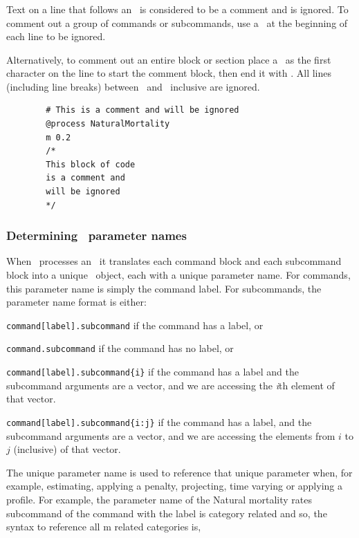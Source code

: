 \subsubsection{}
Text on a line that follows an \commentline\ is considered to be a comment and is ignored. To comment out a group of commands or subcommands, use a \commentline\ at the beginning of each line to be ignored.

Alternatively, to comment out an entire block or section place a \commentstart\ as the first character on the line to start the comment block, then end it with \commentend. All lines (including line breaks) between \commentstart\ and \commentend\ inclusive are ignored. 
{\small{\begin{verbatim}
		# This is a comment and will be ignored
		@process NaturalMortality
		m 0.2
		/* 
		This block of code 
		is a comment and
		will be ignored
		*/
		\end{verbatim}}}

\subsubsection{Determining \CNAME\ parameter names\label{sec:parameter-names}}

When \CNAME\ processes an \config\ it translates each command block and each subcommand block into a unique \CNAME\ object, each with a unique parameter name. For commands, this parameter name is simply the command label. For subcommands, the parameter name format is either: 

\begin{description}
\item \texttt{command[label].subcommand} if the command has a label, or
\item \texttt{command.subcommand} if the command has no label, or
\item \texttt{command[label].subcommand\{i\}} if the command has a label and the subcommand arguments are a vector, and we are accessing the  \emph{i}th element of that vector. 
\item \texttt{command[label].subcommand\{i:j\}} if the command has a label, and the subcommand arguments are a vector, and we are accessing the elements from $i$ to $j$ (inclusive) of that vector.
\end{description} 

The unique parameter name is used to reference that unique parameter when, for example, estimating, applying a penalty, projecting, time varying or applying a profile. For example, the parameter name of the Natural mortality rates subcommand  of the command  with the label  is category related and so, the syntax to reference all m related categories is, 

